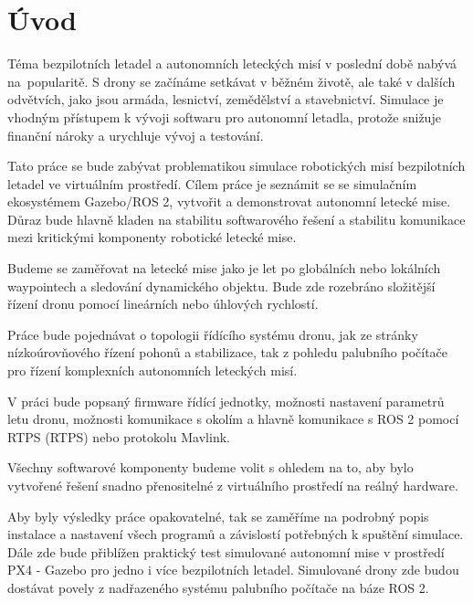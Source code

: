 \chapter*{Úvod}
{}

Téma bezpilotních letadel a autonomních leteckých misí v poslední době nabývá na~popularitě. S drony se začínáme setkávat v běžném životě, ale také v dalších odvětvích, jako jsou armáda, lesnictví, zemědělství a stavebnictví. Simulace je vhodným přístupem k vývoji softwaru pro autonomní letadla, protože snižuje finanční nároky a urychluje vývoj a testování.

Tato práce se bude zabývat problematikou simulace robotických misí bezpilotních letadel ve virtuálním prostředí. Cílem práce je seznámit se se simulačním ekosystémem Gazebo/ROS 2, vytvořit a demonstrovat autonomní letecké mise. Důraz bude hlavně kladen na stabilitu softwarového řešení a stabilitu komunikace mezi kritickými komponenty robotické letecké mise.

Budeme se zaměřovat na letecké mise jako je let po globálních nebo lokálních waypointech a sledování dynamického objektu. Bude zde rozebráno složitější řízení dronu pomocí lineárních nebo úhlových rychlostí. 

Práce bude pojednávat o topologii řídícího systému dronu, jak ze stránky nízkoúrovňového řízení pohonů a stabilizace, tak z pohledu palubního počítače pro řízení komplexních autonomních leteckých misí.

V práci bude popsaný firmware řídící jednotky, možnosti nastavení parametrů letu dronu, možnosti komunikace s okolím a hlavně komunikace s ROS 2 pomocí \acs{RTPS} (\acl{RTPS}) nebo protokolu Mavlink.

Všechny softwarové komponenty budeme volit s ohledem na to, aby bylo vytvořené řešení snadno přenositelné z virtuálního prostředí na reálný hardware.

Aby byly výsledky práce opakovatelné, tak se zaměříme na podrobný popis instalace a nastavení všech programů a závislostí potřebných k spuštění simulace. Dále zde bude přiblížen praktický test simulované autonomní mise v prostředí PX4 - Gazebo pro jedno i více bezpilotních letadel. Simulované drony zde budou dostávat povely z nadřazeného systému palubního počítače na báze ROS 2.
